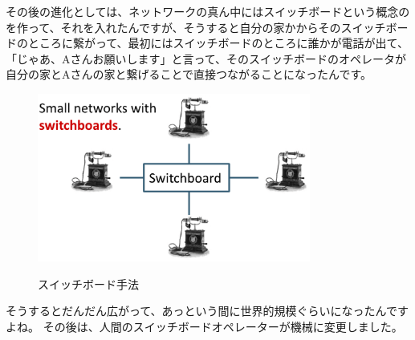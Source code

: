 その後の進化としては、ネットワークの真ん中にはスイッチボードという概念のを作って、それを入れたんですが、そうすると自分の家かからそのスイッチボードのところに繋がって、最初にはスイッチボードのところに誰かが電話が出て、「じゃあ、Aさんお願いします」と言って、そのスイッチボードのオペレータが自分の家とAさんの家と繋げることで直接つながることになったんです。
\begin{figure}[H]
    \includegraphics[width=0.8\textwidth]{lesson1/switchboard.eps}
    \label{fig: 1}
    \caption{スイッチボード手法}
\end{figure}
そうするとだんだん広がって、あっという間に世界的規模ぐらいになったんですよね。
その後は、人間のスイッチボードオペレーターが機械に変更しました。
